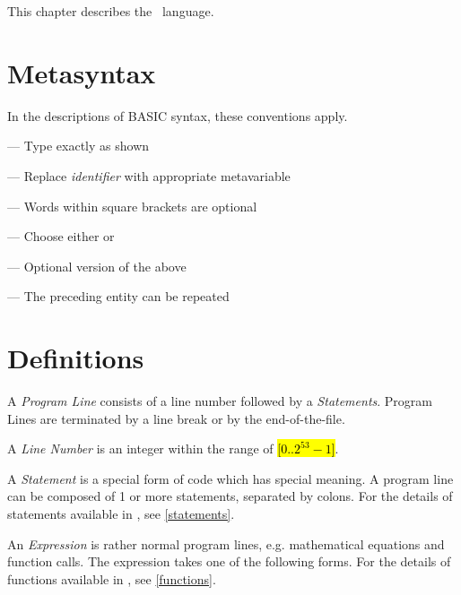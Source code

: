\newcommand{\intrange}{\hl{[$0..2^{53}-1$]}}

This chapter describes the \tbas\ language.

\section{Metasyntax}

In the descriptions of BASIC syntax, these conventions apply.

\begin{itemlist}
\item {} --- Type exactly as shown
\item {} --- Replace \emph{identifier} with appropriate metavariable
\item \code{[a]} --- Words within square brackets are optional
\item {} --- Choose either  or 
\item \code{[a|b]} --- Optional version of the above
\item {} --- The preceding entity can be repeated
\end{itemlist}

\section{Definitions}

A \emph{Program Line} consists of a line number followed by a \emph{Statements}. Program Lines are terminated by a line break or by the end-of-the-file.

A \emph{Line Number} is an integer within the range of \intrange.

A \emph{Statement} is a special form of code which has special meaning. A program line can be composed of 1 or more statements, separated by colons. For the details of statements available in \tbas , see \ref{statements}.


An \emph{Expression} is rather normal program lines, e.g. mathematical equations and function calls. The expression takes one of the following forms. For the details of functions available in \tbas , see \ref{functions}.

\\
\\
\\
\\
\\
\\

